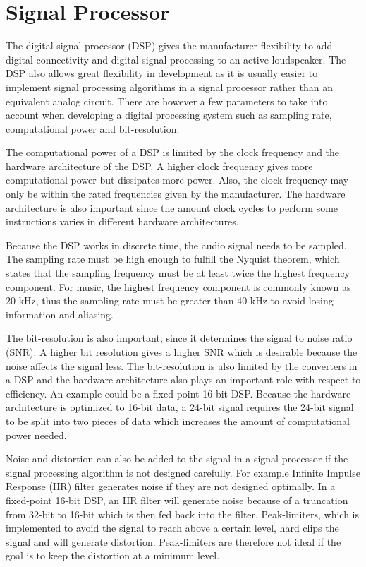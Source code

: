 \section{Signal Processor}

The digital signal processor (DSP) gives the manufacturer flexibility to add digital connectivity and digital signal processing to an active loudspeaker. The DSP also allows great flexibility in development as it is usually easier to implement signal processing algorithms in a signal processor rather than an equivalent analog circuit. There are however a few parameters to take into account when developing a digital processing system such as sampling rate, computational power and bit-resolution. 

The computational power of a DSP is limited by the clock frequency and the hardware architecture of the DSP. A higher clock frequency gives more computational power but dissipates more power. Also, the clock frequency may only be within the rated frequencies given by the manufacturer. The hardware architecture is also important since the amount clock cycles to perform some instructions varies in different hardware architectures.

Because the DSP works in discrete time, the audio signal needs to be sampled. The sampling rate must be high enough to fulfill the Nyquist theorem, which states that the sampling frequency must be at least twice the highest frequency component. For music, the highest frequency component is commonly known as 20 kHz, thus the sampling rate must be greater than 40 kHz to avoid losing information and aliasing.

The bit-resolution is also important, since it determines the signal to noise ratio (SNR). A higher bit resolution gives a higher SNR which is desirable because the noise affects the signal less. The bit-resolution is also limited by the converters in a DSP and the hardware architecture also plays an important role with respect to efficiency. An example could be a fixed-point 16-bit DSP. Because the hardware architecture is optimized to 16-bit data, a 24-bit signal requires the 24-bit signal to be split into two pieces of data which increases the amount of computational power needed.

Noise and distortion can also be added to the signal in a signal processor if the signal processing algorithm is not designed carefully. For example Infinite Impulse Response (IIR) filter generates noise if they are not designed optimally. In a fixed-point 16-bit DSP, an IIR filter will generate noise because of a truncation from 32-bit to 16-bit which is then fed back into the filter. Peak-limiters, which is implemented to avoid the signal to reach above a certain level, hard clips the signal and will generate distortion. Peak-limiters are therefore not ideal if the goal is to keep the distortion at a minimum level.

















